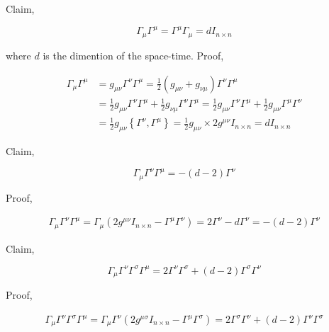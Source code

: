 \subsection{}

Claim,

\begin{equation}
   \Gamma_{\mu}\Gamma^{\mu} = \Gamma^{\mu}\Gamma_{\mu} = d I_{n\times n}
\end{equation}

where $d$ is the dimention of the space-time. Proof,

\begin{align}
   \Gamma_{\mu}\Gamma^{\mu} &= g_{\mu\nu}\Gamma^{\nu}\Gamma^{\mu} = \frac{1}{2}(g_{\mu\nu}+g_{\nu\mu})\Gamma^{\nu}\Gamma^{\mu} \nonumber\\
    &= \frac{1}{2} g_{\mu\nu} \Gamma^{\nu}\Gamma^{\mu} + \frac{1}{2} g_{\nu\mu} \Gamma^{\nu}\Gamma^{\mu} = \frac{1}{2} g_{\mu\nu} \Gamma^{\nu}\Gamma^{\mu} + \frac{1}{2} g_{\mu\nu} \Gamma^{\mu}\Gamma^{\nu} \nonumber\\
    &= \frac{1}{2} g_{\mu\nu} \left\{ \Gamma^{\nu},\Gamma^{\mu} \right\} = \frac{1}{2} g_{\mu\nu} \times 2 g^{\mu\nu} I_{n \times n} = d I_{n \times n}
\end{align}

Claim,

\begin{equation}
   \Gamma_{\mu}\Gamma^{\nu}\Gamma^{\mu} = -(d-2) \Gamma^{\nu}
\end{equation}

Proof,

\begin{align}
   \Gamma_{\mu}\Gamma^{\nu}\Gamma^{\mu} = \Gamma_{\mu}\left(2g^{\mu\nu}I_{n \times n} - \Gamma^{\mu}\Gamma^{\nu}\right) = 2 \Gamma^{\nu} - d \Gamma^{\nu} = -(d-2) \Gamma^{\nu} 
\end{align}

Claim,

\begin{equation}
   \Gamma_{\mu}\Gamma^{\nu}\Gamma^{\sigma}\Gamma^{\mu} = 2 \Gamma^{\nu}\Gamma^{\sigma} + (d-2)\Gamma^{\sigma}\Gamma^{\nu}
\end{equation}

Proof,

\begin{align}
   \Gamma_{\mu}\Gamma^{\nu}\Gamma^{\sigma}\Gamma^{\mu} = \Gamma_{\mu}\Gamma^{\nu}\left(2g^{\mu\sigma}I_{n \times n} - \Gamma^{\mu}\Gamma^{\sigma}\right) = 2 \Gamma^{\sigma}\Gamma^{\nu} + (d-2)\Gamma^{\nu}\Gamma^{\sigma} 
\end{align}

